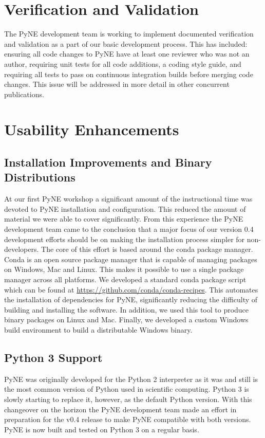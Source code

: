 \documentclass{anstrans}
\begin{document}
\section{Verification and Validation}

The PyNE development team is working to implement documented verification 
and validation as a part of our basic development process. This has included: 
ensuring all code changes to PyNE have at least one reviewer who was not an 
author, requiring unit tests for all code additions, a coding style guide, 
and requiring all tests to pass on continuous integration builds before 
merging code changes. 
This issue will be addressed in more detail in other concurrent publications.

\section{Usability Enhancements}

\subsection{Installation Improvements and Binary Distributions}
At our first PyNE workshop a significant amount of the instructional
time was devoted to PyNE installation and configuration. This reduced 
the amount of material we were able to cover significantly. From this
experience the PyNE development team came to the conclusion that a major
focus of our version 0.4 development efforts should be on making the 
installation process simpler for non-developers.
The core of this effort is based around the conda 
package manager. Conda is an open source package manager that is capable 
of managing packages on Windows, Mac and Linux. This makes it possible to use 
a single package manager across all platforms. We developed a standard conda 
package script which can be found at \url{https://github.com/conda/conda-recipes}. 
This automates the installation of dependencies for PyNE, significantly 
reducing the difficulty of building and installing the software.
In addition, we used this tool to produce binary 
packages on Linux and Mac. Finally, we developed a custom Windows build 
environment to build a distributable Windows binary.

\subsection{Python 3 Support}

PyNE was originally developed for the Python 2 interpreter as it was 
and still is the most common version of Python used in scientific computing. 
Python 3 is slowly starting to replace it, however, as the default Python 
version. With this changeover on the horizon the PyNE development team 
made an effort in preparation for the v0.4 release to make PyNE compatible 
with both versions. PyNE is now built and tested on Python 3 on a regular basis.
\end{document}
